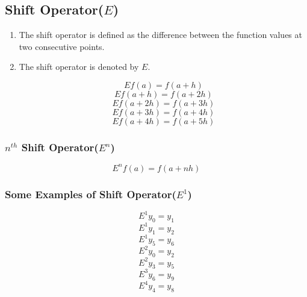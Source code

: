 \subsection{Shift Operator($E$)}

\begin{enumerate}
  \item The shift operator is defined as the difference between the function values at two consecutive points.
  \item The shift operator is denoted by $E$.



  \[E f(a) = f(a +h) \]
  \[E f(a +h) = f(a +2h) \]
  \[E f(a +2h) = f(a +3h) \]
  \[E f(a +3h) = f(a +4h) \]
  \[E f(a +4h) = f(a +5h) \]


\end{enumerate}

\subsubsection{$n^{th}$ Shift Operator($E^n$)}

\[E^n f(a) = f(a + nh)\]



\subsubsection{Some Examples of Shift Operator($E^{1}$)}

\[E^{1} y_0 = y_1\]
\[E^{1} y_1 = y_2\]
\[E^{1} y_5 = y_6\]
\[E^{2} y_0 = y_2\]
\[E^{2} y_3 = y_5\]
\[E^{3} y_6 = y_9\]
\[E^{4} y_4 = y_8\]